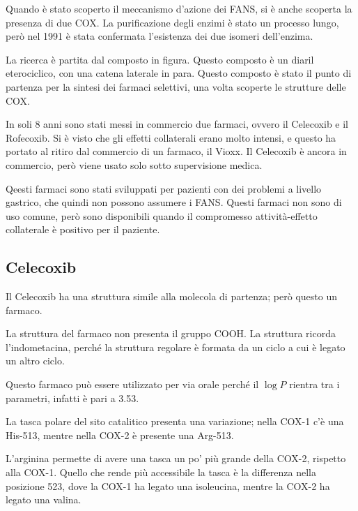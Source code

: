 Quando è stato scoperto il meccanismo d'azione dei FANS, si è anche
scoperta la presenza di due COX. La purificazione degli enzimi è stato
un processo lungo, però nel 1991 è stata confermata l'esistenza dei due
isomeri dell'enzima.


La ricerca è partita dal composto in figura. Questo composto è un diaril
eterociclico, con una catena laterale in para. Questo composto è stato
il punto di partenza per la sintesi dei farmaci selettivi, una volta
scoperte le strutture delle COX.

In soli 8 anni sono stati messi in commercio due farmaci, ovvero il
Celecoxib e il Rofecoxib. Si è visto che gli effetti collaterali erano
molto intensi, e questo ha portato al ritiro dal commercio di un
farmaco, il Vioxx. Il Celecoxib è ancora in commercio, però viene usato
solo sotto supervisione medica.

Qeesti farmaci sono stati sviluppati per pazienti con dei problemi a
livello gastrico, che quindi non possono assumere i FANS. Questi farmaci
non sono di uso comune, però sono disponibili quando il compromesso
attività-effetto collaterale è positivo per il paziente.

\subsection{Celecoxib}

Il Celecoxib ha una struttura simile alla molecola di partenza; però
questo un farmaco.


La struttura del farmaco non presenta il gruppo COOH. La struttura
ricorda l'indometacina, perché la struttura regolare è formata da un
ciclo a cui è legato un altro ciclo.

Questo farmaco può essere utilizzato per via orale perché il
\(\log{} P\) rientra tra i parametri, infatti è pari a 3.53.


La tasca polare del sito catalitico presenta una variazione; nella COX-1
c'è una His-513, mentre nella COX-2 è presente una Arg-513.

L'arginina permette di avere una tasca un po' più grande della COX-2,
rispetto alla COX-1. Quello che rende più accessibile la tasca è la
differenza nella posizione 523, dove la COX-1 ha legato una isoleucina,
mentre la COX-2 ha legato una valina.

